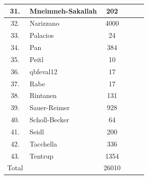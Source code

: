 \documentclass[runningheads]{llncs}
\begin{document}
\begin{table}
\begin{tabular}{c|l|c|c|c|c}
31. & Mneimneh-Sakallah &  202 & &  &  \\ \hline

32. & Narizzano &  4000 & &  &  \\ \hline

33. & Palacios & 24 &  &  &  \\ \hline

34. & Pan &  384 & &  &  \\ \hline

35. & Peitl & 10 &  &  &  \\\hline

36. & qbfeval12 & 17 & &  &  \\ \hline

37. & Rabe &  17 &  & &  \\ \hline

38. & Rintanen &  131 & &  &  \\\hline

39. & Sauer-Reimer &  928 & &  & \\ \hline

40. & Scholl-Becker & 64 &  &  &  \\ \hline

41. & Seidl &  200 &  &  &  \\ \hline

42. & Tacchella &  336 & &  &  \\ \hline

43. & Tentrup & 1354 &  &  &  \\ \hline \hline

Total &  & 26010 &  &  &  \\  \hline \hline


\hline
\end{tabular}
\end{table}
\end{document}
